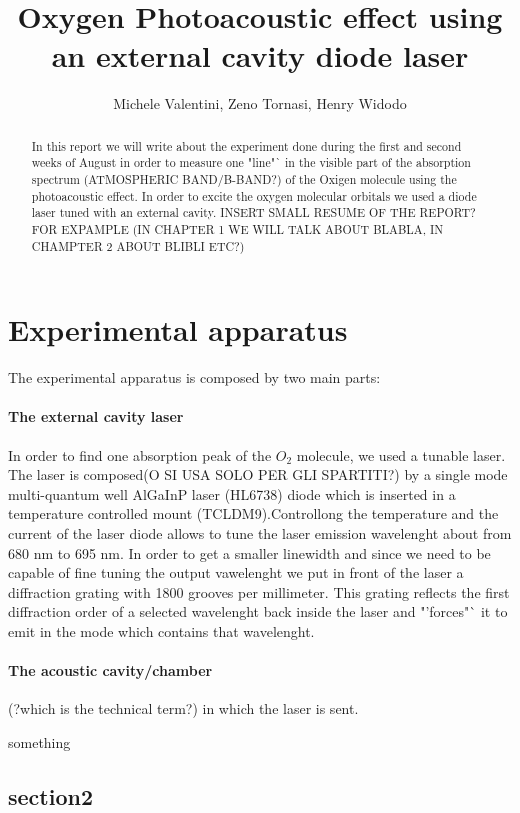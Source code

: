 \documentclass[a4paper,11pt]{article}
\title{Oxygen Photoacoustic effect using an external cavity diode laser}
\author{Michele Valentini, Zeno Tornasi, Henry Widodo}
\begin{document}
\maketitle
\newpage

\begin{abstract}

In this report we will write about the experiment done during the first and second weeks of August in order to measure one "line"` in the visible part of the absorption spectrum (ATMOSPHERIC BAND/B-BAND?) of the Oxigen molecule using the photoacoustic effect. In order to excite the oxygen molecular orbitals we used a diode laser tuned with an external cavity. INSERT SMALL RESUME OF THE REPORT? FOR EXPAMPLE (IN CHAPTER 1 WE WILL TALK ABOUT BLABLA, IN CHAMPTER 2 ABOUT BLIBLI ETC?)
\end{abstract}
\newpage
\section{Experimental apparatus}
The experimental apparatus is composed by two main parts:
\paragraph{The external cavity laser}
In order to find one absorption peak of the $O_2$ molecule, we used a tunable laser. The laser is composed(O SI USA SOLO PER GLI SPARTITI?) by a single mode multi-quantum well AlGaInP laser (HL6738) diode which is inserted in a temperature controlled mount (TCLDM9).Controllong the temperature and the current of the laser diode allows to tune the laser emission wavelenght about from  680 nm to 695 nm. In order to get a smaller linewidth and since we need to be capable of fine tuning the output vawelenght we put in front of the laser a diffraction grating with 1800 grooves per millimeter. This grating reflects the first diffraction order of a selected wavelenght back inside the laser and "'forces"` it to emit in the mode which contains that wavelenght. 
\paragraph{The acoustic cavity/chamber } 
 (?which is the technical term?) in which the laser is sent.



something
\subsection{section2}
\end{document}

